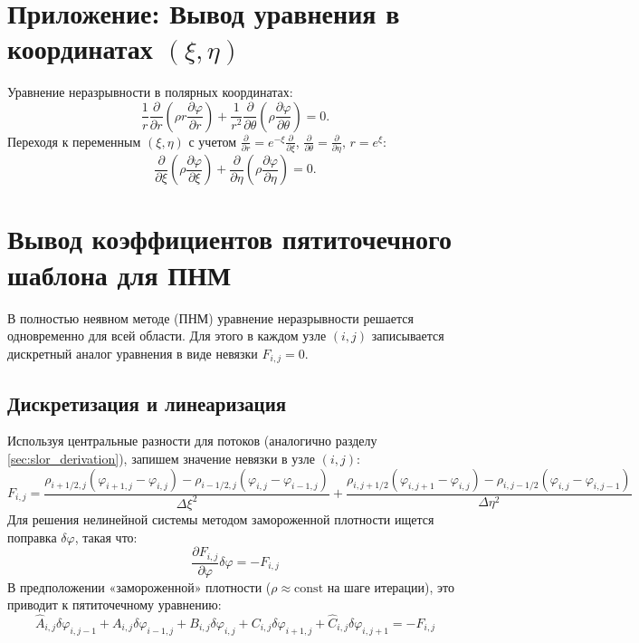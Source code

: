 \appendix
\section{Приложение: Вывод уравнения в координатах \texorpdfstring{$(\xi, \eta)$}{(xi, eta)}}	
Уравнение неразрывности в полярных координатах:
\[
\frac{1}{r} \frac{\partial}{\partial r} \left( \rho r \frac{\partial \varphi}{\partial r} \right) + \frac{1}{r^2} \frac{\partial}{\partial \theta} \left( \rho \frac{\partial \varphi}{\partial \theta} \right) = 0.
\]
Переходя к переменным $(\xi, \eta)$ с учетом $\frac{\partial}{\partial r} = e^{-\xi} \frac{\partial}{\partial \xi}$, $\frac{\partial}{\partial \theta} = \frac{\partial}{\partial \eta}$, $r = e^{\xi}$:
\[
\frac{\partial}{\partial \xi} \left( \rho \frac{\partial \varphi}{\partial \xi} \right) + \frac{\partial}{\partial \eta} \left( \rho \frac{\partial \varphi}{\partial \eta} \right) = 0.
\]


\section{Вывод коэффициентов пятиточечного шаблона для ПНМ}

В полностью неявном методе (ПНМ) уравнение неразрывности решается одновременно для всей области. Для этого в каждом узле $(i, j)$ записывается дискретный аналог уравнения в виде невязки $F_{i, j} = 0$.

\subsection{Дискретизация и линеаризация}

Используя центральные разности для потоков (аналогично разделу \ref{sec:slor_derivation}), запишем значение невязки в узле $(i, j)$:
\[
F_{i,j} = \frac{\rho_{i+1/2,j}(\varphi_{i+1,j} - \varphi_{i,j}) - \rho_{i-1/2,j}(\varphi_{i,j} - \varphi_{i-1,j})}{\Delta \xi^2} + \frac{\rho_{i,j+1/2}(\varphi_{i,j+1} - \varphi_{i,j}) - \rho_{i,j-1/2}(\varphi_{i,j} - \varphi_{i,j-1})}{\Delta \eta^2}
\]
Для решения нелинейной системы методом замороженной плотности ищется поправка $\delta\varphi$, такая что:
\[
\frac{\partial F_{i,j}}{\partial \varphi} \delta\varphi = -F_{i,j}
\]
В предположении «замороженной» плотности ($\rho \approx \text{const}$ на шаге итерации), это приводит к пятиточечному уравнению:
\[
\hat{A}_{i,j} \delta \varphi_{i,j-1} + A_{i,j} \delta \varphi_{i-1,j} + B_{i,j} \delta \varphi_{i,j} + C_{i,j} \delta \varphi_{i+1,j} + \hat{C}_{i,j} \delta \varphi_{i,j+1} = -F_{i,j}
\]

